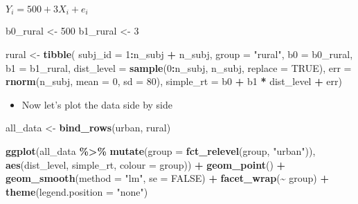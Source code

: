 \documentclass[
]{article}
\newenvironment{Shaded}{\begin{snugshade}}{\end{snugshade}}
\newcommand{\AttributeTok}[1]{\textcolor[rgb]{0.13,0.29,0.53}{#1}}
\newcommand{\ConstantTok}[1]{\textcolor[rgb]{0.56,0.35,0.01}{#1}}
\newcommand{\DecValTok}[1]{\textcolor[rgb]{0.00,0.00,0.81}{#1}}
\newcommand{\FunctionTok}[1]{\textcolor[rgb]{0.13,0.29,0.53}{\textbf{#1}}}
\newcommand{\NormalTok}[1]{#1}
\newcommand{\OtherTok}[1]{\textcolor[rgb]{0.56,0.35,0.01}{#1}}
\newcommand{\SpecialCharTok}[1]{\textcolor[rgb]{0.81,0.36,0.00}{\textbf{#1}}}
\newcommand{\StringTok}[1]{\textcolor[rgb]{0.31,0.60,0.02}{#1}}
\providecommand{\tightlist}{%
  \setlength{\itemsep}{0pt}\setlength{\parskip}{0pt}}
\begin{document}
\(Y_{i} = 500 + 3X_{i} + e_{i}\)

\begin{Shaded}
\begin{Highlighting}[]
\NormalTok{b0\_rural }\OtherTok{\textless{}{-}} \DecValTok{500}
\NormalTok{b1\_rural }\OtherTok{\textless{}{-}} \DecValTok{3}

\NormalTok{rural }\OtherTok{\textless{}{-}} \FunctionTok{tibble}\NormalTok{(}
  \AttributeTok{subj\_id =} \DecValTok{1}\SpecialCharTok{:}\NormalTok{n\_subj }\SpecialCharTok{+}\NormalTok{ n\_subj,}
  \AttributeTok{group =} \StringTok{"rural"}\NormalTok{,}
  \AttributeTok{b0 =}\NormalTok{ b0\_rural,}
  \AttributeTok{b1 =}\NormalTok{ b1\_rural,}
  \AttributeTok{dist\_level =} \FunctionTok{sample}\NormalTok{(}\DecValTok{0}\SpecialCharTok{:}\NormalTok{n\_subj, n\_subj, }\AttributeTok{replace =} \ConstantTok{TRUE}\NormalTok{),}
  \AttributeTok{err =} \FunctionTok{rnorm}\NormalTok{(n\_subj, }\AttributeTok{mean =} \DecValTok{0}\NormalTok{, }\AttributeTok{sd =} \DecValTok{80}\NormalTok{),}
  \AttributeTok{simple\_rt =}\NormalTok{ b0 }\SpecialCharTok{+}\NormalTok{ b1 }\SpecialCharTok{*}\NormalTok{ dist\_level }\SpecialCharTok{+}\NormalTok{ err)}
\end{Highlighting}
\end{Shaded}

\begin{itemize}
\tightlist
\item
  Now let's plot the data side by side
\end{itemize}

\begin{Shaded}
\begin{Highlighting}[]
\NormalTok{all\_data }\OtherTok{\textless{}{-}} 
  \FunctionTok{bind\_rows}\NormalTok{(urban, rural)}

\FunctionTok{ggplot}\NormalTok{(all\_data }\SpecialCharTok{\%\textgreater{}\%} \FunctionTok{mutate}\NormalTok{(}\AttributeTok{group =} \FunctionTok{fct\_relevel}\NormalTok{(group, }\StringTok{"urban"}\NormalTok{)), }
       \FunctionTok{aes}\NormalTok{(dist\_level, simple\_rt, }\AttributeTok{colour =}\NormalTok{ group)) }\SpecialCharTok{+}
  \FunctionTok{geom\_point}\NormalTok{() }\SpecialCharTok{+}
  \FunctionTok{geom\_smooth}\NormalTok{(}\AttributeTok{method =} \StringTok{"lm"}\NormalTok{, }\AttributeTok{se =} \ConstantTok{FALSE}\NormalTok{) }\SpecialCharTok{+}
  \FunctionTok{facet\_wrap}\NormalTok{(}\SpecialCharTok{\textasciitilde{}}\NormalTok{ group) }\SpecialCharTok{+} 
  \FunctionTok{theme}\NormalTok{(}\AttributeTok{legend.position =} \StringTok{"none"}\NormalTok{)}
\end{Highlighting}
\end{Shaded}
\end{document}
